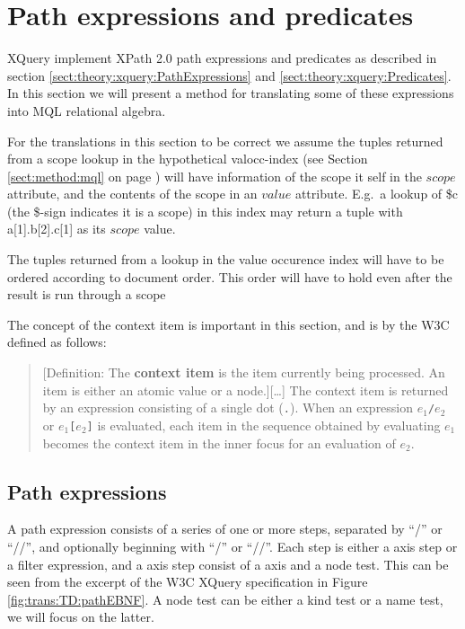 \section{Path expressions and predicates}
\label{sect:trans:TD:pathNpred}

XQuery implement XPath 2.0 path expressions and predicates as described in section
\ref{sect:theory:xquery:PathExpressions} and \ref{sect:theory:xquery:Predicates}. In this section we will present
a method for translating some of these expressions into MQL relational algebra.

For the translations in this section to be correct we assume the tuples returned from a scope lookup in the
hypothetical \textsf{valocc}-index (see Section \ref{sect:method:mql} on page \pageref{sect:method:mql}) will have
information of the scope it self in the $scope$ attribute, and the contents of the scope in an $value$ attribute.
E.g.\ a lookup of \textsf{\$c} (the \textsf{\$}-sign indicates it is a scope) in this index may return a tuple
with \textsf{a[1].b[2].c[1]} as its $scope$ value.

The tuples returned from a lookup in the value occurence index will have to be ordered according to document
order. This order will have to hold even after the result is run through a \textsf{scope}

The concept of the context item is important in this section, and is by the W3C defined as follows\cite{w3c00}:
\begin{quote}
[Definition: The \textbf{context item} is the item currently being processed. An item is either an atomic value or
a node.][\ldots] The context item is returned by an expression consisting of a single dot (\texttt{.}). When an
expression $e_1$\texttt{/}$e_2$ or $e_1$\texttt{[}$e_2$\texttt{]} is evaluated, each item in the sequence obtained
by evaluating $e_1$ becomes the context item in the inner focus for an evaluation of $e_2$.
\end{quote}

\subsection{Path expressions}
\label{sect:trans:TD:pathExprs}
A path expression consists of a series of one or more steps, separated by ``/'' or ``//'', and optionally beginning
with ``/'' or ``//''.  Each step is either a axis step or a filter expression, and a axis step consist of a axis
and a node test. This can be seen from the excerpt of the W3C XQuery
specification in Figure \ref{fig:trans:TD:pathEBNF}. A node test can be either a kind test or a name test, we will focus on the latter. 

